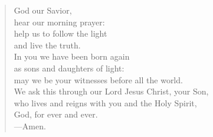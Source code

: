 \prayer

\setlength{\leftmargini}{\prayerleftmargini}

\begin{verse}
God our Savior,\\
hear our morning prayer:\\
help us to follow the light\\
and live the truth.\\
In you we have been born again\\
as sons and daughters of light:\\
may we be your witnesses before all the world.\\
We ask this through our Lord Jesus Christ, your Son,\\
who lives and reigns with you and the Holy Spirit,\\
God, for ever and ever.\\
{\color{red}---\thinspace}Amen.
\end{verse}

\setlength{\leftmargini}{\defleftmargini}
